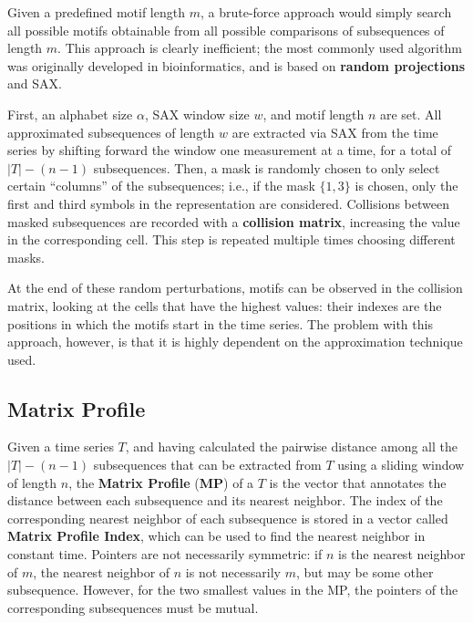 Given a predefined motif length $m$, a brute-force approach would simply search all possible motifs obtainable from all possible comparisons of subsequences of length $m$. This approach is clearly inefficient; the most commonly used algorithm was originally developed in bioinformatics, and is based on \textbf{random projections} and SAX.

First, an alphabet size $\alpha$, SAX window size $w$, and motif length $n$ are set. All approximated subsequences of length $w$ are extracted via SAX from the time series by shifting forward the window one measurement at a time, for a total of $|T| - (n - 1)$ subsequences. Then, a mask is randomly chosen to only select certain ``columns'' of the subsequences; i.e., if the mask $\{1,3\}$ is chosen, only the first and third symbols in the representation are considered. Collisions between masked subsequences are recorded with a \textbf{collision matrix}, increasing the value in the corresponding cell. This step is repeated multiple times choosing different masks.

At the end of these random perturbations, motifs can be observed in the collision matrix, looking at the cells that have the highest values: their indexes are the positions in which the motifs start in the time series. The problem with this approach, however, is that it is highly dependent on the approximation technique used.

\subsection{Matrix Profile}

Given a time series $T$, and having calculated the pairwise distance among all the $|T| - (n - 1)$ subsequences that can be extracted from $T$ using a sliding window of length $n$, the \textbf{Matrix Profile} (\textbf{MP}) of a $T$ is the vector that annotates the distance between each subsequence and its nearest neighbor. The index of the corresponding nearest neighbor of each subsequence is stored in a vector called \textbf{Matrix Profile Index}, which can be used to find the nearest neighbor in constant time. Pointers are not necessarily symmetric: if $n$ is the nearest neighbor of $m$, the nearest neighbor of $n$ is not necessarily $m$, but may be some other subsequence. However, for the two smallest values in the MP, the pointers of the corresponding subsequences must be mutual.

